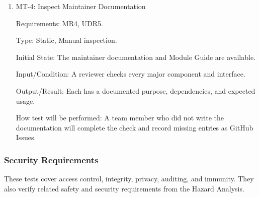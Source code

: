 \documentclass[12pt, titlepage]{article}
\begin{document}
\begin{enumerate}
Requirements: ADR2, SER2, LGR1, MR2.

Type: Dynamic, Manual.

Initial State: Natural-language input and the configured LLM model pass their
tests.

Input/Condition: A developer adds a parser for the Petri net fixture from
IC-EAS-2, then configures a different LLM model.

Output/Result: The Petri net reaches the existing refinement workflow, and the
workflow runs with the new model. The intent-model schema and core workflow are
unchanged.

How test will be performed: The developer will make each change on a test branch,
run IC-EAS-2 and the schema tests, and inspect the diff.

\item{MT-4: Inspect Maintainer Documentation\\}

Requirements: MR4, UDR5.

Type: Static, Manual inspection.

Initial State: The maintainer documentation and Module Guide are available.

Input/Condition: A reviewer checks every major component and interface.

Output/Result: Each has a documented purpose, dependencies, and expected usage.

How test will be performed: A team member who did not write the documentation
will complete the check and record missing entries as GitHub Issues.

\end{enumerate}

\subsubsection{Security Requirements}

These tests cover access control, integrity, privacy, auditing, and immunity. They
also verify related safety and security requirements from the Hazard Analysis.
\end{document}
